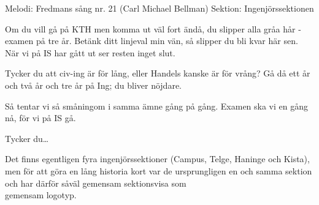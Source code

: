 \begin{song}

\begin{songmeta}
Melodi: Fredmans sång nr. 21 (Carl Michael Bellman)
Sektion: Ingenjörssektionen
\end{songmeta}

\begin{songtext}
Om du vill gå på KTH
men komma ut väl fort ändå,
du slipper alla gråa hår
- examen på tre år.
Betänk ditt linjeval min vän,
så slipper du bli kvar här sen.
När vi på IS har gått ut
ser resten inget slut.

Tycker du att civ-ing är för lång,
eller Handels kanske är för vrång?
Gå då ett år och två år och tre år på Ing;
du bliver nöjdare.

Så tentar vi så småningom
i samma ämne gång på gång.
Examen ska vi en gång nå,
för vi på IS gå.

Tycker du\ldots
\end{songtext}

\begin{songnotes}
Det finns egentligen fyra ingenjörssektioner (Campus, Telge, Haninge och Kista),
men för att göra en lång historia kort var de ursprungligen en och samma sektion
och har därför såväl gemensam sektionsvisa som \\ gemensam logotyp.
\end{songnotes}
\end{song}
